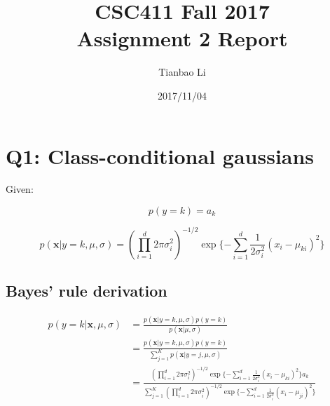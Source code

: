 \documentclass[a4paper]{article}
\title{CSC411 Fall 2017\\Assignment 2 Report}
\author{Tianbao Li}
\date{2017/11/04}
\begin{document}
\maketitle

\section{Q1: Class-conditional gaussians}

Given:

\begin{equation}
    p(y=k)=a_k
\end{equation}

\begin{equation}
    p(\mathbf{x}|y=k,\mu,\sigma)=(\prod^d_{i=1}2\pi\sigma^2_i)^{-1/2}\exp\{-\sum^d_{i=1}\frac{1}{2\sigma^2_i}(x_i-\mu_{ki})^2\}
\end{equation}

\subsection{Bayes' rule derivation}

\begin{align*}
    p(y=k|\mathbf{x},\mu,\sigma)&=\frac{p(\mathbf{x}|y=k,\mu,\sigma)p(y=k)}{p(\mathbf{x}|\mu,\sigma)}\\
    &=\frac{p(\mathbf{x}|y=k,\mu,\sigma)p(y=k)}{\sum^K_{j=1}p(\mathbf{x}|y=j,\mu,\sigma)}\\
    &=\frac{(\prod^d_{i=1}2\pi\sigma^2_i)^{-1/2}\exp\{-\sum^d_{i=1}\frac{1}{2\sigma^2_i}(x_i-\mu_{ki})^2\}a_k}{\sum^K_{j=1}(\prod^d_{i=1}2\pi\sigma^2_i)^{-1/2}\exp\{-\sum^d_{i=1}\frac{1}{2\sigma^2_i}(x_i-\mu_{ji})^2\}}
\end{align*}




\end{document}
